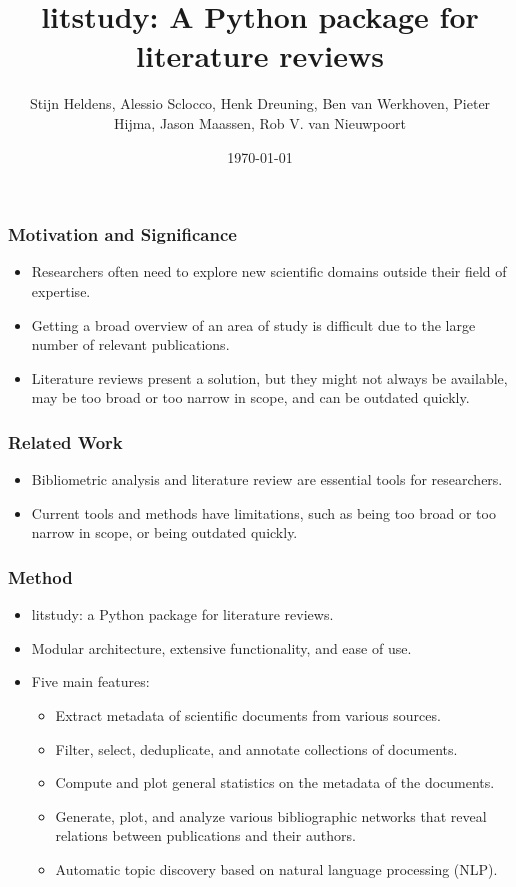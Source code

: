 \documentclass{beamer}
\title{litstudy: A Python package for literature reviews}
\author{Stijn Heldens, Alessio Sclocco, Henk Dreuning, Ben van Werkhoven, Pieter Hijma, Jason Maassen, Rob V. van Nieuwpoort}
\date{\today}
\begin{document}
\begin{frame}
\titlepage
\end{frame}

\begin{frame}
\frametitle{Motivation and Significance}
\begin{itemize}
\item Researchers often need to explore new scientific domains outside their field of expertise.
\item Getting a broad overview of an area of study is difficult due to the large number of relevant publications.
\item Literature reviews present a solution, but they might not always be available, may be too broad or too narrow in scope, and can be outdated quickly.
\end{itemize}
\end{frame}

\begin{frame}
\frametitle{Related Work}
\begin{itemize}
\item Bibliometric analysis and literature review are essential tools for researchers.
\item Current tools and methods have limitations, such as being too broad or too narrow in scope, or being outdated quickly.
\end{itemize}
\end{frame}

\begin{frame}
\frametitle{Method}
\begin{itemize}
\item litstudy: a Python package for literature reviews.
\item Modular architecture, extensive functionality, and ease of use.
\item Five main features:
\begin{itemize}
\item Extract metadata of scientific documents from various sources.
\item Filter, select, deduplicate, and annotate collections of documents.
\item Compute and plot general statistics on the metadata of the documents.
\item Generate, plot, and analyze various bibliographic networks that reveal relations between publications and their authors.
\item Automatic topic discovery based on natural language processing (NLP).
\end{itemize}
\end{itemize}
\end{frame}
\end{document}
